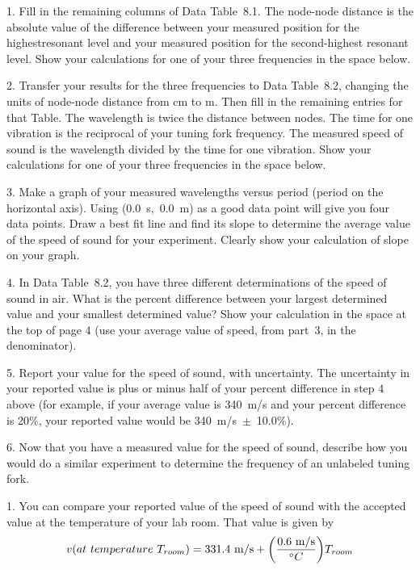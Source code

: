 \item{1.} Fill in the remaining columns of 
Data Table~8.1.  The node-node distance is the absolute
value of the difference between your measured position
for the highest\break resonant level and your measured position
for the second-highest resonant level.  Show your
calculations for one of your three frequencies 
in the space below.
\item{2.} Transfer your results for the three
frequencies to Data Table~8.2, changing the units of
node-node distance from cm to m.  Then fill in
the remaining entries for that Table.  The
wavelength is twice the distance between nodes.
The time for one vibration is the reciprocal of
your tuning fork frequency.  The measured speed
of sound is the wavelength divided by the time
for one vibration.  Show your calculations for 
one of your three frequencies in the space below.
\item{3.} Make a graph of your measured wavelengths
versus period (period on the horizontal axis).  Using
(0.0~s,~0.0~m) as a good data point will give you four
data points.  Draw a best fit line and find its slope
to determine the average value of the speed of sound
for your experiment.  Clearly show your calculation
of slope on your graph.
\bigskip
\item{4.} In Data Table~8.2, you have three different
determinations of the speed of sound in air.  What is
the percent difference between your largest determined
value and your smallest determined value?  Show your
calculation in the space at the top of page 4 (use
your average value of speed, from part~3, in the
denominator).
\vfil\eject
{}
\item{5.} Report your value for the speed of sound,
with uncertainty.  The uncertainty in your reported
value is plus or minus half of your percent difference
in step 4 above (for example, if your average value is
340~m/s and your percent difference is 20\%, your
reported value would be 340~m/s~$\pm$~10.0\%).
\item{6.} Now that you have a measured value for 
the speed of sound, describe how you would do a
similar experiment to determine the frequency of
an unlabeled tuning fork.
\item{1.} You can compare your reported value of 
the speed of sound with the accepted value at the
temperature of your lab room.  That value is given 
by
$$v(at~temperature~T_{room}) = {\rm 331.4~m/s} + 
\biggl({{\rm 0.6~m/s}\over{^\circ C}}\biggr)T_{room}$$
